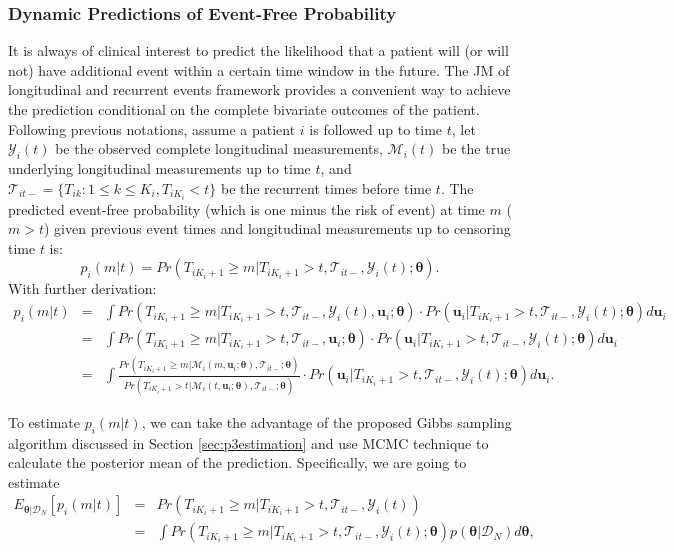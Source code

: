 \subsubsection{Dynamic Predictions of Event-Free Probability}\label{sec:p3prediction}
It is always of clinical interest to predict the likelihood that a patient will (or will not) have additional event within a certain time window in the future. The JM of longitudinal and recurrent events framework provides a convenient way to achieve the prediction conditional on the complete bivariate outcomes of the patient. Following previous notations, assume a patient $i$ is followed up to time $t$, let $\mathcal{Y}_{i}(t)$ be the observed complete longitudinal measurements, $\mathcal{M}_{i}(t)$ be the true underlying longitudinal measurements up to time $t$, and $\mathcal{T}_{it-}=\{T_{ik}: 1\le k\le K_i, T_{iK_i} < t\}$ be the recurrent times before time $t$. The predicted event-free probability (which is one minus the risk of event) at time $m$ ($m > t$) given previous event times and longitudinal measurements up to censoring time $t$ is:
\[p_i(m|t) = Pr(T_{iK_i+1}\ge m | T_{iK_i+1}> t, \mathcal{T}_{it-}, \mathcal{Y}_{i}(t); \boldsymbol{\theta}).\]
With further derivation:
\begin{eqnarray}
\label{eqn:p3surv_prob_derv}
\nonumber p_i(m|t) &=& \int Pr(T_{iK_i+1}\ge m | T_{iK_i+1}> t, \mathcal{T}_{it-}, \mathcal{Y}_{i}(t), \boldsymbol{u}_i; \boldsymbol{\theta}) \cdot Pr(\boldsymbol{u}_i|T_{iK_i+1}> t, \mathcal{T}_{it-}, \mathcal{Y}_{i}(t);\boldsymbol{\theta})d\boldsymbol{u}_i\\
\nonumber&=& \int Pr(T_{iK_i+1}\ge m | T_{iK_i+1}> t, \mathcal{T}_{it-}, \boldsymbol{u}_i; \boldsymbol{\theta}) \cdot Pr(\boldsymbol{u}_i|T_{iK_i+1}> t, \mathcal{T}_{it-}, \mathcal{Y}_{i}(t);\boldsymbol{\theta})d\boldsymbol{u}_i\\
&=&\int \frac{Pr(T_{iK_i+1}\ge m | \mathcal{M}_{i}(m, \boldsymbol{u}_i; \boldsymbol{\theta}), \mathcal{T}_{it-}; \boldsymbol{\theta})}{Pr(T_{iK_i+1}> t | \mathcal{M}_{i}(t, \boldsymbol{u}_i; \boldsymbol{\theta}), \mathcal{T}_{it-}; \boldsymbol{\theta})}\cdot Pr(\boldsymbol{u}_i|T_{iK_i+1}> t, \mathcal{T}_{it-}, \mathcal{Y}_{i}(t);\boldsymbol{\theta})d\boldsymbol{u}_i.
\end{eqnarray}



To estimate $p_i(m|t)$, we can take the advantage of the proposed Gibbs sampling algorithm discussed in Section \ref{sec:p3estimation} and use MCMC technique to calculate the posterior mean of the prediction. Specifically, we are going to estimate
\begin{eqnarray}\label{eqn:pexpct_pred}
\nonumber E_{\boldsymbol{\theta}|\mathcal{D}_N}[p_i(m|t)]&=&Pr(T_{iK_i+1}\ge m | T_{iK_i+1}> t, \mathcal{T}_{it-}, \mathcal{Y}_{i}(t))\\
&=&\int Pr(T_{iK_i+1}\ge m | T_{iK_i+1}> t, \mathcal{T}_{it-}, \mathcal{Y}_{i}(t); \boldsymbol{\theta})p(\boldsymbol{\theta}|\mathcal{D}_N)d\boldsymbol{\theta},
\end{eqnarray}

